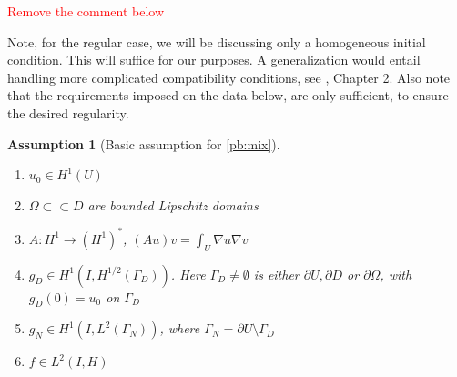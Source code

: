 \documentclass[english,a4paper,10pt,oneside]{scrbook}	%
\theoremstyle{break}
\newtheorem{ass}[equation]{Assumption}
\theoremstyle{remark}
\newcommand{\cc}{\subset\subset}
\begin{document}
\textcolor{red}{Remove the comment below}

Note, for the regular case, we will be discussing only a homogeneous initial condition. This will suffice for our purposes. A generalization would entail handling more complicated compatibility conditions, see \cite{lions}, Chapter 2. Also note that the requirements imposed on the data below, are only sufficient, to ensure the desired regularity.

\begin{ass}[Basic assumption for \cref{pb:mix}]
\label{ass:basic_par_mix}
\textcolor{white}{ }
\begin{enumerate}
	\item $u_0 \in H^1(U)$
	\item $\Omega \cc D$ are bounded Lipschitz domains
	\item $A: H^1 \rightarrow (H^1)^*$, $(Au)v = \int_U \nabla u \nabla v$
	\item $g_D \in H^1(I, H^{1/2}(\Gamma_D))$. Here $\Gamma_D\neq \emptyset$ is either $\partial U, \partial D $ or $\partial \Omega$, with $g_D(0) = u_0$ on $\Gamma_D$
	\item $g_N \in H^1(I, L^2(\Gamma_N))$, where $\Gamma_N = \partial U \setminus \Gamma_D$
	\item $f \in L^2(I, H)$
\end{enumerate}
\end{ass}
\end{document}
